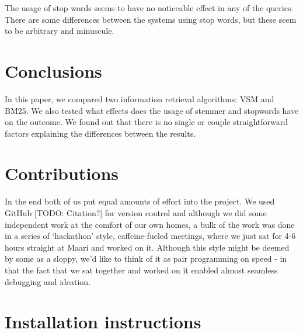 The usage of stop words seems to have no noticeable effect in any of the queries. There are some differences between the systems using stop words, but these seem to be arbitrary and minuscule. 




\section{Conclusions}

In this paper, we compared two information retrieval algorithms: VSM and BM25. We also tested what effects does the usage of stemmer and stopwords have on the outcome. We found out that there is no single or couple straightforward factors explaining the differences between the results. 



\section{Contributions}
In the end both of us put equal amounts of effort into the project. 
We used GitHub [TODO: Citation?] for version control and although we did
some independent work at the comfort of our own homes, a bulk of the work
was done in a series of \lq hackathon' style, caffeine-fueled meetings, where we just sat
for 4-6 hours straight at Maari and worked on it. Although this style might be deemed by some
as a sloppy, we'd like to think of it as pair programming on speed - in that 
the fact that we sat together and worked on it enabled almost seamless debugging
and ideation.\\




\clearpage

\nocite{*}




\clearpage
\appendix
\section{Installation instructions} \label{App:instructions}

